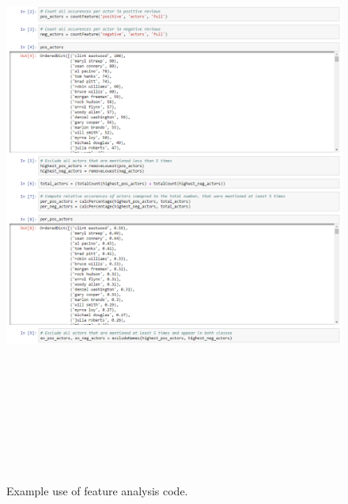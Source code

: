 \documentclass[
10pt, %
a4paper, %
oneside, %
headinclude,footinclude, %
] {book}%
\begin{document}
\begin{figure}[hbtp]\centering
\includegraphics[width=6in, height=8in]{example_ana} 
\caption{Example use of feature analysis code.\label{Figure 6}}
\end{figure}
\end{document}

